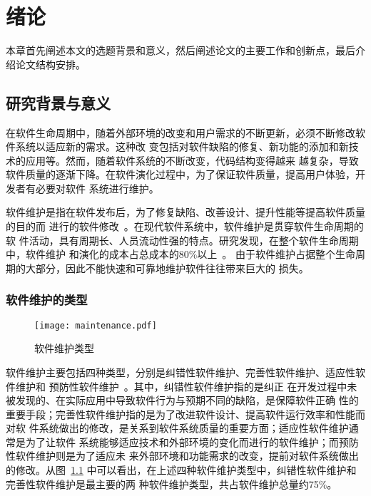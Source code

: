 
\chapter{绪论}
\label{chpt:introduction}
本章首先阐述本文的选题背景和意义，然后阐述论文的主要工作和创新点，最后介绍论文结构安排。

\section{研究背景与意义}
在软件生命周期中，随着外部环境的改变和用户需求的不断更新，必须不断修改软件系统以适应新的需求。这种改
变包括对软件缺陷的修复、新功能的添加和新技术的应用等。然而，随着软件系统的不断改变，代码结构变得越来
越复杂，导致软件质量的逐渐下降。在软件演化过程中，为了保证软件质量，提高用户体验，开发者有必要对软件
系统进行维护。

软件维护是指在软件发布后，为了修复缺陷、改善设计、提升性能等提高软件质量的目的而
进行的软件修改~\cite{IEEE1219}。在现代软件系统中，软件维护是贯穿软件生命周期的软
件活动，具有周期长、人员流动性强的特点。研究发现，在整个软件生命周期中，软件维护
和演化的成本占总成本的80\%以上~\cite{guimaraes1983managing, coleman1994using}。
由于软件维护占据整个生命周期的大部分，因此不能快速和可靠地维护软件往往带来巨大的
损失。

\subsection{软件维护的类型}

\begin{figure}
  \centering
  \texttt{[image: maintenance.pdf]}  
  \caption{\label{fig:maintenance}软件维护类型}
\end{figure}

软件维护主要包括四种类型，分别是纠错性软件维护、完善性软件维护、适应性软件维护和
预防性软件维护~\cite{lientz1978characteristics}。其中，纠错性软件维护指的是纠正
在开发过程中未被发现的、在实际应用中导致软件行为与预期不同的缺陷，是保障软件正确
性的重要手段；完善性软件维护指的是为了改进软件设计、提高软件运行效率和性能而对软
件系统做出的修改，是关系到软件系统质量的重要方面；适应性软件维护通常是为了让软件
系统能够适应技术和外部环境的变化而进行的软件维护；而预防性软件维护则是为了适应未
来外部环境和功能需求的改变，提前对软件系统做出的修改。从图~\ref{fig:maintenance}
中可以看出，在上述四种软件维护类型中，纠错性软件维护和完善性软件维护是最主要的两
种软件维护类型，共占软件维护总量约75\%。

